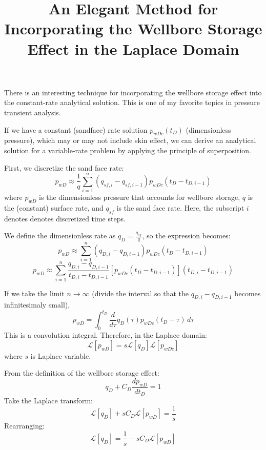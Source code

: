 \documentclass[letterpaper, 12pt]{article}
\title{An Elegant Method for Incorporating the Wellbore Storage Effect in the Laplace Domain}
\date{}
\theoremstyle{custom}
\begin{document}
\maketitle
There is an interesting technique for incorporating the wellbore storage effect into the constant-rate analytical solution.
This is one of my favorite topics in pressure transient analysis.

If we have a constant (sandface) rate solution $p_{wDc}(t_D)$ (dimensionless pressure), which may or may not include skin effect,
we can derive an analytical solution for a variable-rate problem by applying the principle of superposition.

First, we discretize the sand face rate:
\begin{equation*}
  p_{wD} \approx \frac{1}{q} \sum_{i=1}^{n} (q_{sf,i} - q_{sf,i-1}) p_{wDc} \left( t_{D} - t_{D,i-1} \right)
\end{equation*}
where $p_{wD}$ is the dimensionless pressure  that accounts for wellbore storage, $q$ is the (constant) surface rate, and $q_{sf}$ is the sand face rate.
Here, the subscript $i$ denotes denotes discretized time steps.

We define the dimensionless rate as $q_D = \displaystyle \frac{q_{sf}}{q}$, so the expression becomes:
\begin{equation*}
  p_{wD} \approx \sum_{i=1}^{n} (q_{D,i} - q_{D,i-1}) p_{wDc}\left( t_{D} - t_{D,i-1} \right)
\end{equation*}
\begin{equation*}
  p_{wD} \approx \sum_{i=1}^{n} \frac{q_{D,i} - q_{D,i-1}}{t_{D,i} - t_{D,i-1}} \left[ p_{wDc}\left( t_{D} - t_{D,i-1} \right) \right] \left( t_{D,i} - t_{D,i-1} \right)
\end{equation*}

If we take the limit $n \rightarrow \infty$ (divide the interval so that the $q_{D,i} - q_{D,i-1}$ becomes infinitesimaly small), 
\begin{equation*}
  p_{wD} = \int_{0}^{t_D} \frac{d}{d \tau}q_D(\tau) p_{wDc}(t_D - \tau) \, d\tau
\end{equation*}
This is a convolution integral.  Therefore, in the Laplace domain:
\begin{equation}
  \label{eq1}
  \mathcal{L} \left[ p_{wD} \right] = s \mathcal{L} \left[ q_D \right] \mathcal{L} \left[ p_{wDc} \right]
\end{equation}
where $s$ is Laplace variable.

From the definition of the wellbore storage effect:
\begin{equation*}
  q_D + C_D \frac{d p_{wD}}{d t_D} = 1
\end{equation*}
Take the Laplace transform:
\begin{equation*}
  \mathcal{L} \left[ q_D \right] + s C_D \mathcal{L} \left[ p_{wD} \right]  = \frac{1}{s}
\end{equation*}
Rearranging:
\begin{equation}
  \label{eq2}
  \mathcal{L} \left[ q_D \right]  = \frac{1}{s} - s C_D \mathcal{L} \left[ p_{wD} \right]
\end{equation}
\end{document}
